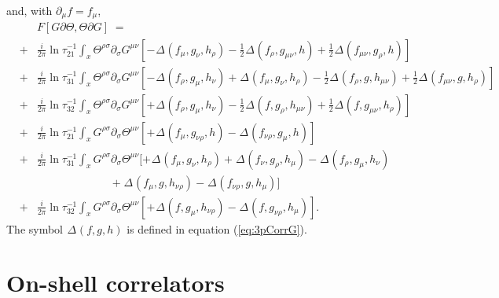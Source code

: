 \documentclass[a4paper,11pt]{article}               \def\new#1\endnew{{\bf #1}}
\newcommand {\tri}[2] {{}_{#1}\Delta_{#2}}
\begin{document}
and, with $\partial_\mu f = f_\mu$, 
\begin{eqnarray}
  \label{eq:GdTTdG}
  && F[G\partial\Theta, \Theta\partial G] \; = \;
\nonumber\\
   &+& \frac i{2\pi} \ln\tau_{21}^{-1}\int _x 
              \Theta^{\rho\sigma} \partial_\sigma G^{\mu\nu}
              [-         \tri{}{} (f_\mu, g_\nu, h_\rho)
               -\frac 12 \tri{}{} (f_\rho, g_{\mu\nu}, h)
               +\frac 12 \tri{}{} (f_{\mu\nu}, g_\rho, h)
              ]
\nonumber\\
   &+& \frac i{2\pi} \ln\tau_{31}^{-1}\int _x 
              \Theta^{\rho\sigma} \partial_\sigma G^{\mu\nu}
              [-\tri{}{} (f_\rho, g_\mu, h_\nu)
               +\tri{}{} (f_\mu, g_\nu, h_\rho)
               -\frac 12 \tri{}{} (f_\rho, g, h_{\mu\nu})
               +\frac 12 \tri{}{} (f_{\mu\nu}, g, h_\rho)
              ]
\nonumber\\
   &+& \frac i{2\pi} \ln\tau_{32}^{-1}\int _x 
              \Theta^{\rho\sigma} \partial_\sigma G^{\mu\nu}
              [+\tri{}{} (f_\rho, g_\mu, h_\nu)
               -\frac 12 \tri{}{} (f, g_\rho, h_{\mu\nu})
               +\frac 12 \tri{}{} (f, g_{\mu\nu}, h_\rho)
              ]
\nonumber\\
   &+& \frac i{2\pi} \ln\tau_{21}^{-1}\int _x 
              G^{\rho\sigma} \partial_\sigma \Theta^{\mu\nu}
              [+\tri{}{} (f_\mu, g_{\nu\rho}, h)
               -\tri{}{} (f_{\nu\rho}, g_\mu, h)
              ]
\nonumber\\
   &+& \frac i{2\pi} \ln\tau_{31}^{-1}\int _x 
              G^{\rho\sigma} \partial_\sigma \Theta^{\mu\nu}
              [+\tri{}{} (f_\mu, g_\nu, h_\rho)
               +\tri{}{} (f_\nu, g_\rho, h_\mu)
               -\tri{}{} (f_\rho, g_\mu, h_\nu)
\nonumber\\
   & & ~~~~~~~~~~~~~~~~~~~~~~~~~~~~~~ +\tri{}{} (f_\mu, g, h_{\nu\rho})
               -\tri{}{} (f_{\nu\rho}, g, h_\mu)
              ]
\nonumber\\
   &+& \frac i{2\pi} \ln\tau_{32}^{-1}\int _x 
              G^{\rho\sigma} \partial_\sigma \Theta^{\mu\nu}
              [+\tri{}{} (f, g_\mu, h_{\nu\rho})
               -\tri{}{} (f, g_{\nu\rho}, h_\mu)
              ].
\end{eqnarray}
The symbol $\tri{}{} (f, g, h)$ is defined in equation (\ref{eq:3pCorrG}).


\section{On-shell correlators}
\label{sec:onshell}
\end{document}
